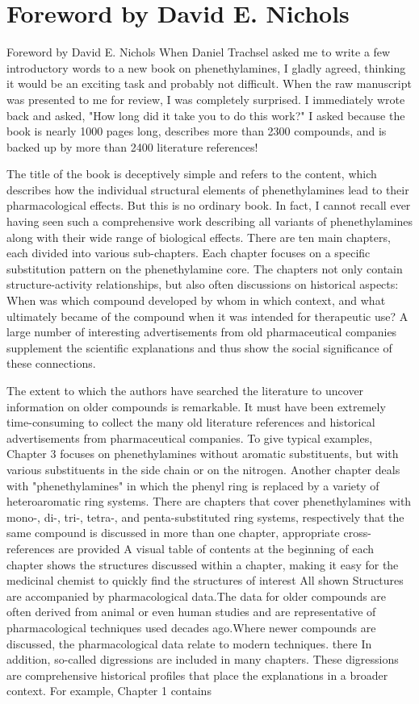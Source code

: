 
\section{Foreword by David E. Nichols}

Foreword by David E. Nichols
When Daniel Trachsel asked me to write a few introductory words to a new book on phenethylamines, I gladly agreed, thinking it would be an exciting task and probably not difficult. When the raw manuscript was presented to me for review, I was completely surprised. I immediately wrote back and asked, "How long did it take you to do this work?" I asked because the book is nearly 1000 pages long, describes more than 2300 compounds, and is backed up by more than 2400 literature references!

The title of the book is deceptively simple and refers to the content, which describes how the individual structural elements of phenethylamines lead to their pharmacological effects. But this is no ordinary book. In fact, I cannot recall ever having seen such a comprehensive work describing all variants of phenethylamines along with their wide range of biological effects. There are ten main chapters, each divided into various sub-chapters.
Each chapter focuses on a specific substitution pattern on the phenethylamine core. The chapters not only contain structure-activity relationships, but also often discussions on historical aspects: When was which compound developed by whom in which context, and what ultimately became of the compound when it was intended for therapeutic use? A large number of interesting advertisements from old pharmaceutical companies supplement the scientific explanations and thus show the social significance of these connections.

The extent to which the authors have searched the literature to uncover information on older compounds is remarkable. It must have been extremely time-consuming to collect the many old literature references and historical advertisements from pharmaceutical companies. To give typical examples, Chapter 3 focuses on phenethylamines without aromatic substituents, but with various substituents in the side chain or on the nitrogen. Another chapter deals with "phenethylamines" in which the phenyl ring is replaced by a variety of heteroaromatic ring systems. There are chapters that cover phenethylamines with mono-, di-, tri-, tetra-, and penta-substituted ring systems, respectively that the same compound is discussed in more than one chapter, appropriate cross-references are provided A visual table of contents at the beginning of each chapter shows the structures discussed within a chapter, making it easy for the medicinal chemist to quickly find the structures of interest All shown Structures are accompanied by pharmacological data.The data for older compounds are often derived from animal or even human studies and are representative of pharmacological techniques used decades ago.Where newer compounds are discussed, the pharmacological data relate to modern techniques. there In addition, so-called digressions are included in many chapters. These digressions are comprehensive historical profiles that place the explanations in a broader context. For example, Chapter 1 contains
\clearpage

